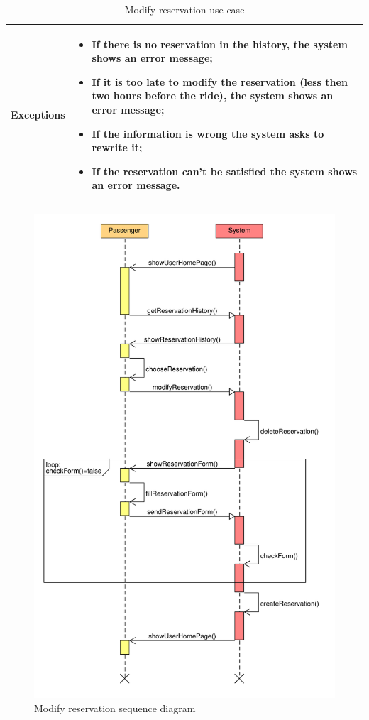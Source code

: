 \begin{table}
\begin{center}
\begin{tabular}{lp{}}
\textbf{Exceptions}	&	\begin{itemize}
					\item	If there is no reservation in the history, the system shows an error message;
					\item	If it is too late to modify the reservation (less then two hours before the ride), the system shows an error message;
					\item	If the information is wrong the system asks to rewrite it;
					\item	If the reservation can't be satisfied the system shows an error message.
					\end{itemize}	\\
\bottomrule
\end{tabular}
\caption{Modify reservation use case}
\end{center}
\end{table}

\begin{figure}
\centering
\includegraphics[width=\textwidth]{tex-images/sequence-modify-reservation}
\caption{Modify reservation sequence diagram}
\end{figure}



